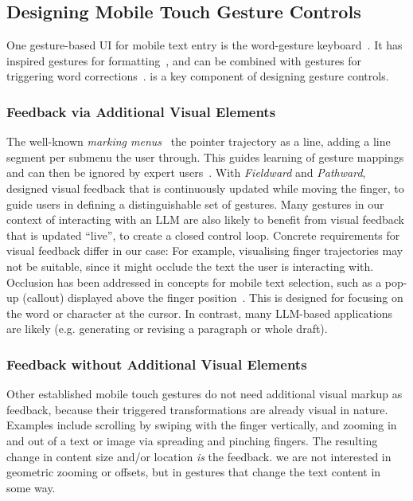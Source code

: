 \subsection{Designing Mobile Touch Gesture Controls}
One  gesture-based UI for mobile text entry is the word-gesture keyboard~\cite{Zhai2012gesturekbMagazine}. It has inspired gestures for formatting~\cite{Alvina2017commandboard}, and can be combined with gestures for triggering word corrections~\cite{Cui2020justcorrect, Zhang2019typthencorrect}.  is a key component of designing gesture controls.


\subsubsection{Feedback via Additional Visual Elements}
The well-known \textit{marking menus}~\cite{Kurtenbach1993markingmenus}  the pointer trajectory as a line, adding a line segment per submenu the user  through. This guides learning of gesture mappings and can then be ignored by expert users~\cite{Kurtenbach1994markingmenus}. 
With \textit{Fieldward} and \textit{Pathward}, \citet{Malloch2017fieldpathward} designed visual feedback that is continuously updated while moving the finger, to guide users in defining a distinguishable set of gestures. Many gestures in our context of interacting with an LLM are also likely to benefit from visual feedback that is updated ``live'', to create a closed control loop.
Concrete requirements for visual feedback differ in our case: For example, visualising finger trajectories may not be suitable, since it might occlude the text the user is interacting with. 
Occlusion has been addressed in concepts for mobile text selection, such as a pop-up (callout) displayed above the finger position~\cite{Ishii2016callout, Vogel2007shift}. This is designed for focusing on the word or character at the cursor. In contrast, many LLM-based applications are likely  (e.g. generating or revising a paragraph or whole draft).



\subsubsection{Feedback without Additional Visual Elements}
Other established mobile touch gestures do not need additional visual markup as feedback, because their triggered transformations are already visual in nature. Examples include scrolling by swiping with the finger vertically, and zooming in and out of a text or image via spreading and pinching fingers. The resulting change in content size and/or location \textit{is} the feedback.  we are not interested in geometric zooming or offsets, but in gestures that change the text content in some way.


